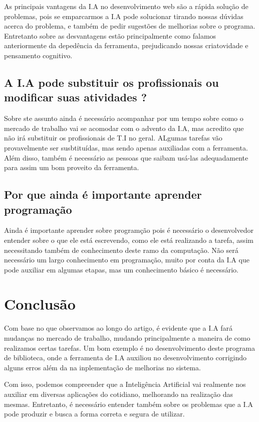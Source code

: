 \documentclass[12pt]{article}
\begin{document}
        As principais vantagens da I.A no desenvolvimento web são a rápida solução de problemas, pois se emparcarmos a I.A pode solucionar tirando nossas dúvidas acerca do problema, e também de pedir sugestões de melhorias sobre o programa. Entretanto sobre as desvantagens estão principalmente como falamos anteriormente da depedência da ferramenta, prejudicando nossas criatovidade e pensamento cognitivo.

        \subsection{A I.A pode substituir os profissionais ou modificar suas atividades ?}

        Sobre ste assunto ainda é necessário acompanhar por um tempo sobre como o mercado de trabalho vai se acomodar com o advento da I.A, mas acredito que não irá substituir os profissionais de T.I no geral. ALgumas tarefas vão provavelmente ser susbtituídas, mas sendo apenas auxiliadas com a ferramenta. Além disso, também é necessário as pessoas que saibam usá-las adequadamente para assim um bom proveito da ferramenta.

        \subsection{Por que ainda é importante aprender programação}

        Ainda é importante aprender sobre programção pois é necessário o desenvolvedor entender sobre o que ele está escrevendo, como ele está realizando a tarefa, assim necessitando também de conhecimento deste ramo da computação. Não será necessário um largo conhecimento em programação, muito por conta da I.A que pode auxiliar em algumas etapas, mas um conhecimento básico é necessário.

    \section{Conclusão}

        Com base no que observamos ao longo do artigo, é evidente que a I.A fará mudanças no mercado de trabalho, mudando principalmente a maneira de como realizamos certas tarefas. Um bom exemplo é no desenvolvimento deste programa de biblioteca, onde a ferramenta de I.A auxiliou no desenvolvimento corrigindo alguns erros além da na inplementação de melhorias no sistema. 

        Com isso, podemos compreender que a Inteligência Artificial vai realmente nos auxiliar em diversas aplicações do cotidiano, melhorando na realização das mesmas. Entretanto, é necessário entender também sobre os problemas que a I.A pode produzir e busca a forma correta e segura de utilizar.
\end{document}
